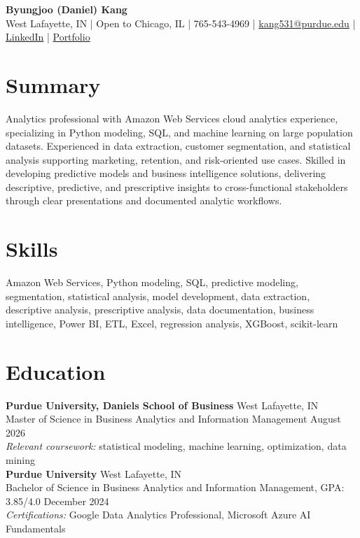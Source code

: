 \documentclass[11pt,a4paper]{article}
\begin{document}
\pagestyle{empty}

\begin{center}
    {\Huge \textbf{Byungjoo (Daniel) Kang}} \\[4pt]
    West Lafayette, IN | Open to Chicago, IL | 765-543-4969 | \href{mailto:kang531@purdue.edu}{kang531@purdue.edu} |
    \href{https://www.linkedin.com/in/daniel-byungjoo-kang/}{LinkedIn} | \href{https://daniel-kang-vs.github.io}{Portfolio}
\end{center}

\section*{Summary}
Analytics professional with Amazon Web Services cloud analytics experience, specializing in Python modeling, SQL, and machine learning on large population datasets. Experienced in data extraction, customer segmentation, and statistical analysis supporting marketing, retention, and risk-oriented use cases. Skilled in developing predictive models and business intelligence solutions, delivering descriptive, predictive, and prescriptive insights to cross-functional stakeholders through clear presentations and documented analytic workflows.

\section*{Skills}
Amazon Web Services, Python modeling, SQL, predictive modeling, segmentation, statistical analysis, model development, data extraction, descriptive analysis, prescriptive analysis, data documentation, business intelligence, Power BI, ETL, Excel, regression analysis, XGBoost, scikit-learn

\section*{Education}
\noindent
\textbf{Purdue University, Daniels School of Business} \hfill West Lafayette, IN \\
Master of Science in Business Analytics and Information Management \hfill August 2026 \\
\textit{Relevant coursework:} statistical modeling, machine learning, optimization, data mining \\[6pt]
\textbf{Purdue University} \hfill West Lafayette, IN \\
Bachelor of Science in Business Analytics and Information Management, GPA: 3.85/4.0 \hfill December 2024 \\
\textit{Certifications:} Google Data Analytics Professional, Microsoft Azure AI Fundamentals
\end{document}
